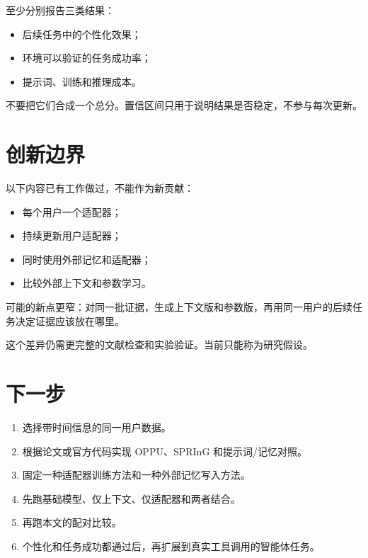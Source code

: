 \documentclass[11pt,UTF8,fontset=fandol]{ctexart}
\begin{document}
至少分别报告三类结果：
\begin{itemize}
  \item 后续任务中的个性化效果；
  \item 环境可以验证的任务成功率；
  \item 提示词、训练和推理成本。
\end{itemize}
不要把它们合成一个总分。置信区间只用于说明结果是否稳定，不参与每次更新。

\section{创新边界}

以下内容已有工作做过，不能作为新贡献：
\begin{itemize}
  \item 每个用户一个适配器；
  \item 持续更新用户适配器；
  \item 同时使用外部记忆和适配器；
  \item 比较外部上下文和参数学习。
\end{itemize}

可能的新点更窄：对同一批证据，生成上下文版和参数版，再用同一用户的后续任务决定证据应该放在哪里。

这个差异仍需更完整的文献检查和实验验证。当前只能称为研究假设。

\section{下一步}

\begin{enumerate}
  \item 选择带时间信息的同一用户数据。
  \item 根据论文或官方代码实现 OPPU、SPRInG 和提示词/记忆对照。
  \item 固定一种适配器训练方法和一种外部记忆写入方法。
  \item 先跑基础模型、仅上下文、仅适配器和两者结合。
  \item 再跑本文的配对比较。
  \item 个性化和任务成功都通过后，再扩展到真实工具调用的智能体任务。
\end{enumerate}
\end{document}
